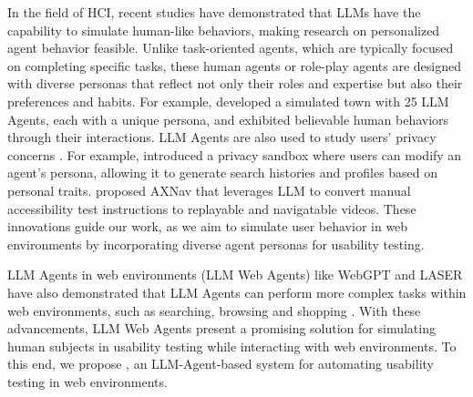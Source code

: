 In the field of HCI, recent studies have demonstrated that LLMs have the capability to simulate human-like behaviors, making research on personalized agent behavior feasible. Unlike task-oriented agents, which are typically focused on completing specific tasks, these human agents or role-play agents \cite{chen2025towards} are designed with diverse personas that reflect not only their roles and expertise but also their preferences and habits. For example, \citet{parkGenerativeAgentsInteractive2023} developed a simulated town with 25 LLM Agents, each with a unique persona, and exhibited believable human behaviors through their interactions. 
LLM Agents are also used to study users' privacy concerns \cite{zhangPrivacyLeakageOvershadowed2025,chenEmpathyBasedSandboxApproach2024}. For example, \citet{chenEmpathyBasedSandboxApproach2024} introduced a privacy sandbox where users can modify an agent’s persona, allowing it to generate search histories and profiles based on personal traits.
\citet{taebAXNavReplayingAccessibility2024} proposed AXNav that leverages LLM to convert manual accessibility test instructions to replayable and navigatable videos.
These innovations guide our work, as we aim to simulate user behavior in web environments by incorporating diverse agent personas for usability testing.

LLM Agents in web environments (LLM Web Agents) like WebGPT \cite{nakanoWebGPTBrowserassistedQuestionanswering2022} and LASER \cite{maLASERLLMAgent2024} have also demonstrated that LLM Agents can perform more complex tasks within web environments, such as searching, browsing and shopping \cite{yaoWebShopScalableRealWorld2022}.
With these advancements, LLM Web Agents present a promising solution for simulating human subjects in usability testing while interacting with web environments.
To this end, we propose \projectname, an LLM-Agent-based system for automating usability testing in web environments.